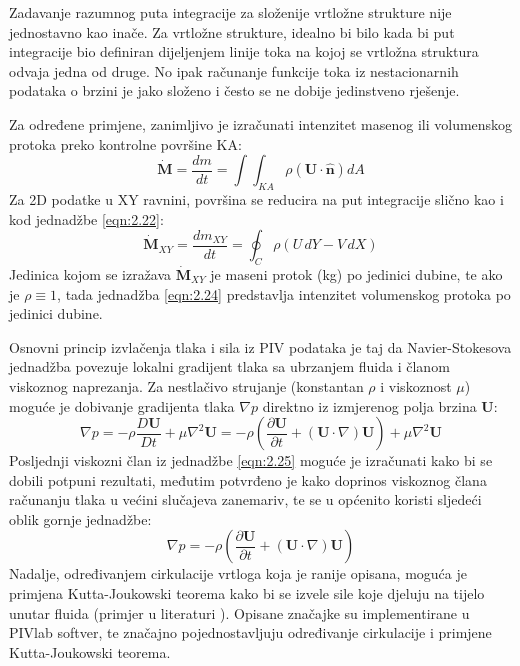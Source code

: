 \begin{description}[style=unboxed,leftmargin=0cm]
	\par
	Zadavanje razumnog puta integracije za složenije vrtložne strukture nije jednostavno kao inače. Za vrtložne strukture, idealno bi bilo kada bi put integracije bio definiran dijeljenjem linije toka na kojoj se vrtložna struktura odvaja jedna od druge. No ipak računanje funkcije toka iz nestacionarnih podataka o brzini je jako složeno i često se ne dobije jedinstveno rješenje.
	\item[Linijski integral - maseni protok] Za određene primjene, zanimljivo je izračunati intenzitet masenog ili volumenskog protoka preko kontrolne površine KA:
	\begin{equation}
		\boldsymbol{\dot{M}}=\frac{dm}{dt}=\int \int_{KA}\rho(\boldsymbol{U}\cdot \boldsymbol{\hat{n}})dA
		\label{eqn:2.23}
	\end{equation}
	Za 2D podatke u XY ravnini, površina se reducira na put integracije slično kao i kod jednadžbe \ref{eqn:2.22}:
	\begin{equation}
		\boldsymbol{\dot{M}}_{XY}=\frac{dm_{XY}}{dt}=\oint_{C}\rho(U \, dY-V \, dX)
		\label{eqn:2.24}
	\end{equation}
	Jedinica kojom se izražava $\boldsymbol{\dot{M}}_{XY}$ je maseni protok (kg) po jedinici dubine, te ako je $\rho \equiv 1$, tada jednadžba \ref{eqn:2.24} predstavlja intenzitet volumenskog protoka po jedinici dubine. 
	\item[Tlak i sile iz PIV podataka] Osnovni princip izvlačenja tlaka i sila iz PIV podataka je taj da Navier-Stokesova jednadžba povezuje lokalni gradijent tlaka sa ubrzanjem fluida i članom viskoznog naprezanja. Za nestlačivo strujanje (konstantan $\rho$ i viskoznost $\mu$) moguće je dobivanje gradijenta tlaka $\nabla p$ direktno iz izmjerenog polja brzina $\boldsymbol{U}$:
	\begin{equation}
		\nabla p = -\rho \frac{D\boldsymbol{U}}{Dt}+\mu \nabla^{2}\boldsymbol{U}=-\rho \left(\frac{\partial \boldsymbol{U}}{\partial t}+(\boldsymbol{U}\cdot\nabla)\boldsymbol{U}\right)+\mu \nabla^{2}\boldsymbol{U}
		\label{eqn:2.25}
	\end{equation}
	Posljednji viskozni član iz jednadžbe \ref{eqn:2.25} moguće je izračunati kako bi se dobili potpuni rezultati, međutim potvrđeno je kako doprinos viskoznog člana računanju tlaka u većini slučajeva zanemariv, te se u općenito koristi sljedeći oblik gornje jednadžbe:
	\begin{equation}
		\nabla p = -\rho \left(\frac{\partial \boldsymbol{U}}{\partial t}+(\boldsymbol{U}\cdot\nabla)\boldsymbol{U}\right)
		\label{eqn:2.26}
	\end{equation}
	Nadalje, određivanjem cirkulacije vrtloga koja je ranije opisana, moguća je primjena Kutta-Joukowski teorema kako bi se izvele sile koje djeluju na tijelo unutar fluida (primjer u literaturi \cite{henningsson2011time}). Opisane značajke su implementirane u PIVlab softver, te značajno pojednostavljuju određivanje cirkulacije i primjene Kutta-Joukowski teorema.
\end{description}
